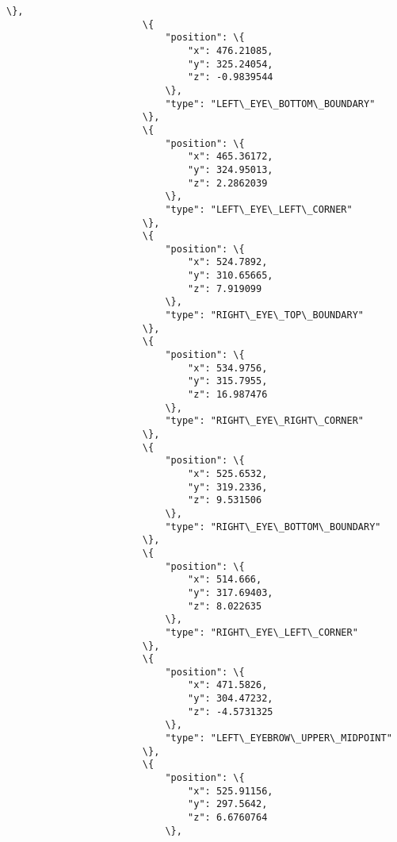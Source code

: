 \documentclass[11pt]{article}
\begin{document}
\begin{Verbatim}[commandchars=\\\{\}]
                        \},
                        \{
                            "position": \{
                                "x": 476.21085,
                                "y": 325.24054,
                                "z": -0.9839544
                            \},
                            "type": "LEFT\_EYE\_BOTTOM\_BOUNDARY"
                        \},
                        \{
                            "position": \{
                                "x": 465.36172,
                                "y": 324.95013,
                                "z": 2.2862039
                            \},
                            "type": "LEFT\_EYE\_LEFT\_CORNER"
                        \},
                        \{
                            "position": \{
                                "x": 524.7892,
                                "y": 310.65665,
                                "z": 7.919099
                            \},
                            "type": "RIGHT\_EYE\_TOP\_BOUNDARY"
                        \},
                        \{
                            "position": \{
                                "x": 534.9756,
                                "y": 315.7955,
                                "z": 16.987476
                            \},
                            "type": "RIGHT\_EYE\_RIGHT\_CORNER"
                        \},
                        \{
                            "position": \{
                                "x": 525.6532,
                                "y": 319.2336,
                                "z": 9.531506
                            \},
                            "type": "RIGHT\_EYE\_BOTTOM\_BOUNDARY"
                        \},
                        \{
                            "position": \{
                                "x": 514.666,
                                "y": 317.69403,
                                "z": 8.022635
                            \},
                            "type": "RIGHT\_EYE\_LEFT\_CORNER"
                        \},
                        \{
                            "position": \{
                                "x": 471.5826,
                                "y": 304.47232,
                                "z": -4.5731325
                            \},
                            "type": "LEFT\_EYEBROW\_UPPER\_MIDPOINT"
                        \},
                        \{
                            "position": \{
                                "x": 525.91156,
                                "y": 297.5642,
                                "z": 6.6760764
                            \},

\end{Verbatim}
\end{document}
